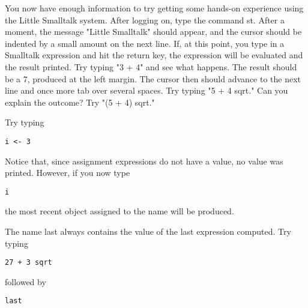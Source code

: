 
You now have enough information to try getting some hands-on experience
using the Little Smalltalk system. After logging on, type the command st.
After a moment, the message "Little Smalltalk" should appear, and the
cursor should be indented by a small amount on the next line. If, at this
point, you type in a Smalltalk expression and hit the return key, the expression will be evaluated and the result printed. Try typing "3 + 4" and see
what happens. The result should be a 7, produced at the left margin. The
cursor then should advance to the next line and once more tab over several
spaces. Try typing "5 + 4 sqrt." Can you explain the outcome? Try "(5 +
4) sqrt."

Try typing
\begin{lstlisting}
i <- 3
\end{lstlisting}
Notice that, since assignment expressions do not have a value, no value
was printed. However, if you now type
\begin{lstlisting}
i
\end{lstlisting}
the most recent object assigned to the name will be produced.

The name last always contains the value of the last expression computed. Try typing
\begin{lstlisting}
27 + 3 sqrt
\end{lstlisting}
followed by
\begin{lstlisting}
last
\end{lstlisting}
